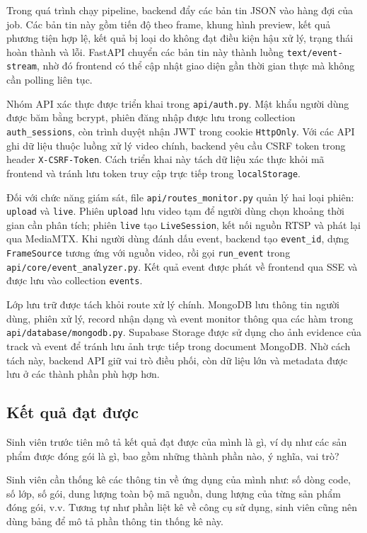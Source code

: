 \documentclass[../DoAn.tex]{subfiles}
\begin{document}
Trong quá trình chạy pipeline, backend đẩy các bản tin JSON vào hàng đợi của job. Các bản tin này gồm tiến độ theo frame, khung hình preview, kết quả phương tiện hợp lệ, kết quả bị loại do không đạt điều kiện hậu xử lý, trạng thái hoàn thành và lỗi. FastAPI chuyển các bản tin này thành luồng \texttt{text/event-stream}, nhờ đó frontend có thể cập nhật giao diện gần thời gian thực mà không cần polling liên tục.

Nhóm API xác thực được triển khai trong \texttt{api/auth.py}. Mật khẩu người dùng được băm bằng bcrypt, phiên đăng nhập được lưu trong collection \texttt{auth\_sessions}, còn trình duyệt nhận JWT trong cookie \texttt{HttpOnly}. Với các API ghi dữ liệu thuộc luồng xử lý video chính, backend yêu cầu CSRF token trong header \texttt{X-CSRF-Token}. Cách triển khai này tách dữ liệu xác thực khỏi mã frontend và tránh lưu token truy cập trực tiếp trong \texttt{localStorage}.

Đối với chức năng giám sát, file \texttt{api/routes\_monitor.py} quản lý hai loại phiên: \texttt{upload} và \texttt{live}. Phiên \texttt{upload} lưu video tạm để người dùng chọn khoảng thời gian cần phân tích; phiên \texttt{live} tạo \texttt{LiveSession}, kết nối nguồn RTSP và phát lại qua MediaMTX. Khi người dùng đánh dấu event, backend tạo \texttt{event\_id}, dựng \texttt{FrameSource} tương ứng với nguồn video, rồi gọi \texttt{run\_event} trong \texttt{api/core/event\_analyzer.py}. Kết quả event được phát về frontend qua SSE và được lưu vào collection \texttt{events}.

Lớp lưu trữ được tách khỏi route xử lý chính. MongoDB lưu thông tin người dùng, phiên xử lý, record nhận dạng và event monitor thông qua các hàm trong \texttt{api/database/mongodb.py}. Supabase Storage được sử dụng cho ảnh evidence của track và event để tránh lưu ảnh trực tiếp trong document MongoDB. Nhờ cách tách này, backend API giữ vai trò điều phối, còn dữ liệu lớn và metadata được lưu ở các thành phần phù hợp hơn.

\subsection{Kết quả đạt được}
Sinh viên trước tiên mô tả kết quả đạt được của mình là gì, ví dụ như các sản phẩm được đóng gói là gì, bao gồm những thành phần nào, ý nghĩa, vai trò?

Sinh viên cần thống kê các thông tin về ứng dụng của mình như: số dòng code, số lớp, số gói, dung lượng toàn bộ mã nguồn, dung lượng của từng sản phẩm đóng gói, v.v. Tương tự như phần liệt kê về công cụ sử dụng, sinh viên cũng nên dùng bảng để mô tả phần thông tin thống kê này.
\end{document}
